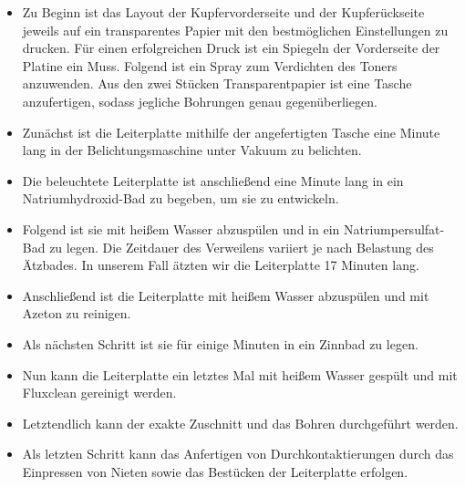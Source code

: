 \begin{itemize}
    \item Zu Beginn ist das Layout der Kupfervorderseite und der Kupferückseite jeweils auf ein transparentes Papier mit den bestmöglichen Einstellungen zu drucken.
    Für einen erfolgreichen Druck ist ein Spiegeln der Vorderseite der Platine ein Muss.
    Folgend ist ein Spray zum Verdichten des Toners anzuwenden.
    Aus den zwei Stücken Transparentpapier ist eine Tasche anzufertigen, sodass jegliche Bohrungen genau gegenüberliegen. \\

    \item Zunächst ist die Leiterplatte mithilfe der angefertigten Tasche eine Minute lang in der Belichtungsmaschine unter Vakuum zu belichten. \\

    \item Die beleuchtete Leiterplatte ist anschließend eine Minute lang in ein Natriumhydroxid-Bad zu begeben, um sie zu entwickeln. \\

    \item Folgend ist sie mit heißem Wasser abzuspülen und in ein Natriumpersulfat-Bad zu legen.
    Die Zeitdauer des Verweilens variiert je nach Belastung des Ätzbades.
    In unserem Fall ätzten wir die Leiterplatte 17 Minuten lang. \\

    \item Anschließend ist die Leiterplatte mit heißem Wasser abzuspülen und mit Azeton zu reinigen. \\

    \item Als nächsten Schritt ist sie für einige Minuten in ein Zinnbad zu legen. \\

    \item Nun kann die Leiterplatte ein letztes Mal mit heißem Wasser gespült und mit Fluxclean gereinigt werden.

    \item Letztendlich kann der exakte Zuschnitt und das Bohren durchgeführt werden. \\

    \item Als letzten Schritt kann das Anfertigen von Durchkontaktierungen durch das Einpressen von Nieten sowie das Bestücken der Leiterplatte erfolgen.
\end{itemize}

